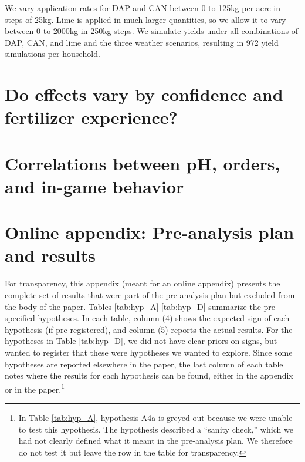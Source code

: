 \documentclass[12pt,letterpaper]{article}
\begin{document}
We vary application rates for DAP and CAN between 0 to 125kg per acre in steps of 25kg. Lime is applied in much larger quantities, so we allow it to vary between 0 to 2000kg in 250kg steps. We simulate yields under all combinations of DAP, CAN, and lime and the three weather scenarios, resulting in 972 yield simulations per household.

\newpage
\section{Do effects vary by confidence and fertilizer experience?}\label{sec:appendix-het}
\setcounter{table}{0}
\renewcommand{\thetable}{\Alph{section}\arabic{table}}

\newpage


\newpage
\section{Correlations between pH, orders, and in-game behavior}\label{sec:appendix-game_dapcanlime}
\setcounter{table}{0}
\renewcommand{\thetable}{\Alph{section}\arabic{table}}




\clearpage
\section{Online appendix: Pre-analysis plan and results}\label{sec:appendix-PAP}
\setcounter{table}{0}
\renewcommand{\thetable}{\Alph{section}\arabic{table}}

For transparency, this appendix (meant for an online appendix) presents the complete set of results that were part of the pre-analysis plan but excluded from the body of the paper. Tables \ref{tab:hyp_A}-\ref{tab:hyp_D} summarize the pre-specified hypotheses. In each table, column (4) shows the expected sign of each hypothesis (if pre-registered), and column (5) reports the actual results. For the hypotheses in Table \ref{tab:hyp_D}, we did not have clear priors on signs, but wanted to register that these were hypotheses we wanted to explore. Since some hypotheses are reported elsewhere in the paper, the last column of each table notes where the results for each hypothesis can be found, either in the appendix or in the paper.\footnote{In Table \ref{tab:hyp_A}, hypothesis A4a is greyed out because we were unable to test this hypothesis. The hypothesis described a ``sanity check,'' which we had not clearly defined what it meant in the pre-analysis plan. We therefore do not test it but leave the row in the table for transparency.}
\end{document}
